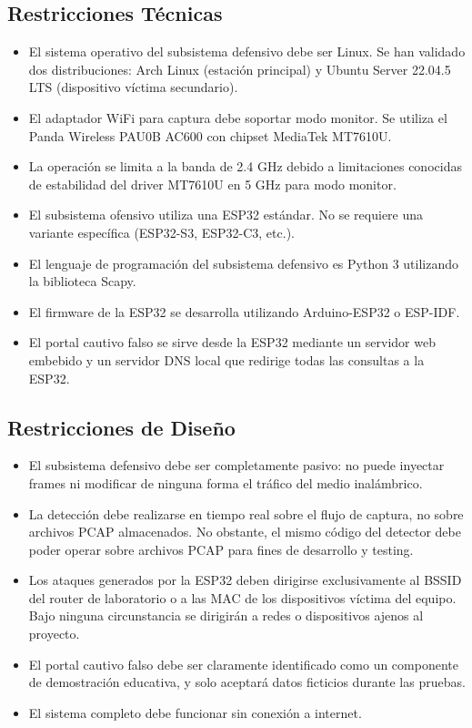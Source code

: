 \documentclass[11pt,a4paper]{article}
\begin{document}
\subsection{Restricciones Técnicas}
\begin{itemize}
  \item El sistema operativo del subsistema defensivo debe ser Linux. Se han
    validado dos distribuciones: Arch Linux (estación principal) y Ubuntu
    Server 22.04.5 LTS (dispositivo víctima secundario).
  \item El adaptador WiFi para captura debe soportar modo monitor. Se utiliza
    el Panda Wireless PAU0B AC600 con chipset MediaTek MT7610U.
  \item La operación se limita a la banda de 2.4 GHz debido a limitaciones
    conocidas de estabilidad del driver MT7610U en 5 GHz para modo monitor.
  \item El subsistema ofensivo utiliza una ESP32 estándar. No se requiere una
    variante específica (ESP32-S3, ESP32-C3, etc.).
  \item El lenguaje de programación del subsistema defensivo es Python 3
    utilizando la biblioteca Scapy.
  \item El firmware de la ESP32 se desarrolla utilizando Arduino-ESP32 o
    ESP-IDF.
  \item El portal cautivo falso se sirve desde la ESP32 mediante un servidor
    web embebido y un servidor DNS local que redirige todas las consultas a
    la ESP32.
\end{itemize}

\subsection{Restricciones de Diseño}
\begin{itemize}
  \item El subsistema defensivo debe ser completamente pasivo: no puede
    inyectar frames ni modificar de ninguna forma el tráfico del medio
    inalámbrico.
  \item La detección debe realizarse en tiempo real sobre el flujo de
    captura, no sobre archivos PCAP almacenados. No obstante, el mismo código
    del detector debe poder operar sobre archivos PCAP para fines de
    desarrollo y testing.
  \item Los ataques generados por la ESP32 deben dirigirse exclusivamente al
    BSSID del router de laboratorio o a las MAC de los dispositivos víctima
    del equipo. Bajo ninguna circunstancia se dirigirán a redes o
    dispositivos ajenos al proyecto.
  \item El portal cautivo falso debe ser claramente identificado como un
    componente de demostración educativa, y solo aceptará datos ficticios
    durante las pruebas.
  \item El sistema completo debe funcionar sin conexión a internet.
\end{itemize}
\end{document}
